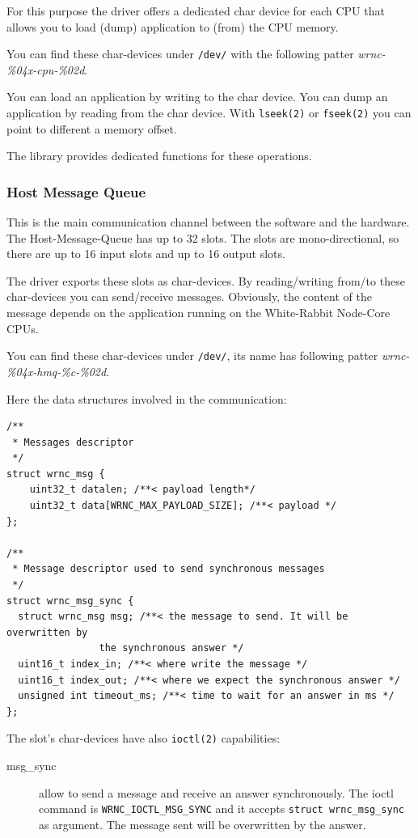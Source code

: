 \documentclass[a4paper,10pt]{article}
\begin{document}
For this purpose the driver offers a dedicated char device for each
CPU that allows you to load (dump) application to (from) the CPU
memory.

You can find these char-devices under \texttt{/dev/} with the
following patter \textit{wrnc-\%04x-cpu-\%02d}.

You can load an application by writing to the char device. You can
dump an application by reading from the char device. With
\texttt{lseek(2)} or \texttt{fseek(2)} you can point to different
a memory offset.

The library provides dedicated functions for these operations.


\subsubsection{Host Message Queue}%
This is the main communication channel between the software and the
hardware. The Host-Message-Queue has up to 32 slots. The slots are
mono-directional, so there are up to 16 input slots and up to 16
output slots.

The driver exports these slots as char-devices. By reading/writing
from/to these char-devices you can send/receive messages. Obviously,
the content of the message depends on the application running on the
White-Rabbit Node-Core CPUs.

You can find these char-devices under \texttt{/dev/}, its name has
following patter \textit{wrnc-\%04x-hmq-\%c-\%02d}.

Here the data structures involved in the communication:

\begin{lstlisting}
/**
 * Messages descriptor
 */
struct wrnc_msg {
	uint32_t datalen; /**< payload length*/
	uint32_t data[WRNC_MAX_PAYLOAD_SIZE]; /**< payload */
};

/**
 * Message descriptor used to send synchronous messages
 */
struct wrnc_msg_sync {
  struct wrnc_msg msg; /**< the message to send. It will be overwritten by
				the synchronous answer */
  uint16_t index_in; /**< where write the message */
  uint16_t index_out; /**< where we expect the synchronous answer */
  unsigned int timeout_ms; /**< time to wait for an answer in ms */
};
\end{lstlisting}

The slot's char-devices have also \texttt{ioctl(2)} capabilities:
\begin{description}
  \item[msg\_sync] allow to send a message and receive an answer
    synchronously. The ioctl command is \texttt{WRNC\_IOCTL\_MSG\_SYNC}
    and it accepts \texttt{struct wrnc\_msg\_sync} as argument. The
    message sent will be overwritten by the answer.
\end{description}
\end{document}
